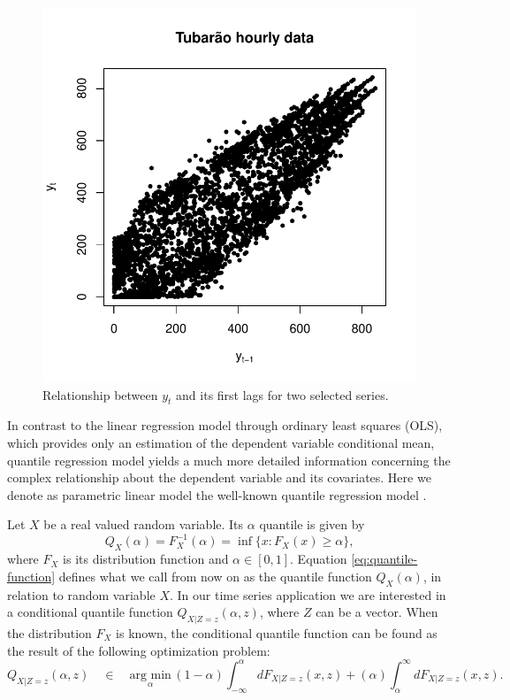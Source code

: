 \begin{figure}
\begin{minipage}[t]{\linewidth}
\begin{minipage}[t]{0.45\linewidth}
      \centering     \includegraphics[width=\textwidth]{Figuras/Solar-exemplos/scatterplot}
    \end{minipage}
  \end{minipage}
  \caption{Relationship between $y_t$ and its first lags for two selected series.}
  \label{fig:scatterplot-1lag}
\end{figure}

In contrast to the linear regression model through ordinary least squares (OLS), which provides only an estimation of the dependent variable conditional mean, quantile regression model yields a much more detailed information concerning the complex relationship about the dependent variable and its covariates. Here we denote as parametric linear model the well-known quantile regression model \cite{koenker2005quantile}.

Let $X$ be a real valued random variable. Its $\alpha$ quantile is given by 
\begin{equation}
Q_X(\alpha) = F_X^{-1}(\alpha) = \inf\{x: F_X(x) \geq \alpha\},
\label{eq:quantile-function}
\end{equation}
where $F_X$ is its distribution function and $\alpha \in [0,1]$. Equation \ref{eq:quantile-function} defines what we call from now on as the quantile function $Q_X(\alpha)$, in relation to random variable $X$. In our time series application we are interested in a conditional quantile function $Q_{X|Z=z}(\alpha, z)$, where $Z$ can be a vector.
When the distribution $F_X$ is known, the conditional quantile function can be found as the result of the following optimization problem:
\begin{equation}
Q_{X|Z=z}(\alpha, z) \quad \in \quad \underset{\alpha}{ \text{arg min}} \, (1-\alpha) \int_{-\infty}^{\alpha} dF_{X|Z=z}(x,z) + 
(\alpha) \int^{\infty}_{\alpha} dF_{X|Z=z}(x,z).
\end{equation}

